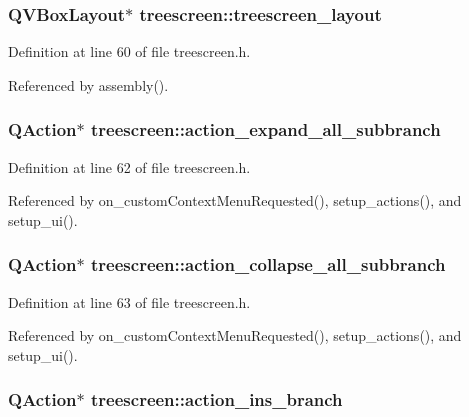 \subsubsection{\setlength{\rightskip}{0pt plus 5cm}QVBox\-Layout$\ast$ {\bf treescreen::treescreen\_\-layout}\hspace{0.3cm}{\tt  [private]}}\label{classtreescreen_87613c12a99430668ea2b3e2d3575b06}




Definition at line 60 of file treescreen.h.

Referenced by assembly().
\subsubsection{\setlength{\rightskip}{0pt plus 5cm}QAction$\ast$ {\bf treescreen::action\_\-expand\_\-all\_\-subbranch}\hspace{0.3cm}{\tt  [private]}}\label{classtreescreen_159b44d763e2e9570a67a638938e8ded}




Definition at line 62 of file treescreen.h.

Referenced by on\_\-custom\-Context\-Menu\-Requested(), setup\_\-actions(), and setup\_\-ui().
\subsubsection{\setlength{\rightskip}{0pt plus 5cm}QAction$\ast$ {\bf treescreen::action\_\-collapse\_\-all\_\-subbranch}\hspace{0.3cm}{\tt  [private]}}\label{classtreescreen_823165521f9f5b521324d9cf4fced89b}




Definition at line 63 of file treescreen.h.

Referenced by on\_\-custom\-Context\-Menu\-Requested(), setup\_\-actions(), and setup\_\-ui().
\subsubsection{\setlength{\rightskip}{0pt plus 5cm}QAction$\ast$ {\bf treescreen::action\_\-ins\_\-branch}\hspace{0.3cm}{\tt  [private]}}\label{classtreescreen_ab5ee2502a63997e608205efaeb79225}




